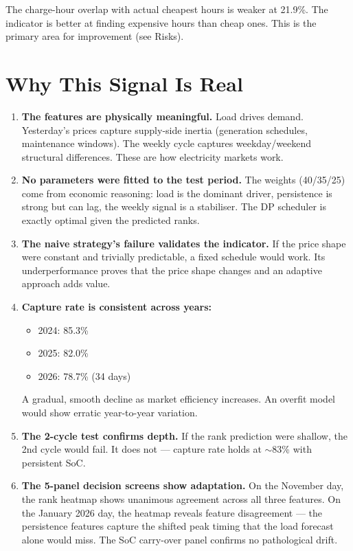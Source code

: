 \documentclass[11pt,a4paper]{article}
\begin{document}
The charge-hour overlap with actual cheapest hours is weaker at 21.9\%. The indicator is better at finding expensive hours than cheap ones. This is the primary area for improvement (see Risks).

\section{Why This Signal Is Real}

\begin{enumerate}[leftmargin=*]
\item \textbf{The features are physically meaningful.} Load drives demand. Yesterday's prices capture supply-side inertia (generation schedules, maintenance windows). The weekly cycle captures weekday/weekend structural differences. These are how electricity markets work.

\item \textbf{No parameters were fitted to the test period.} The weights (40/35/25) come from economic reasoning: load is the dominant driver, persistence is strong but can lag, the weekly signal is a stabiliser. The DP scheduler is exactly optimal given the predicted ranks.

\item \textbf{The naive strategy's failure validates the indicator.} If the price shape were constant and trivially predictable, a fixed schedule would work. Its underperformance proves that the price shape changes and an adaptive approach adds value.

\item \textbf{Capture rate is consistent across years:}
\begin{itemize}
\item 2024: 85.3\%
\item 2025: 82.0\%
\item 2026: 78.7\% (34 days)
\end{itemize}
A gradual, smooth decline as market efficiency increases. An overfit model would show erratic year-to-year variation.

\item \textbf{The 2-cycle test confirms depth.} If the rank prediction were shallow, the 2nd cycle would fail. It does not --- capture rate holds at $\sim$83\% with persistent SoC.

\item \textbf{The 5-panel decision screens show adaptation.} On the November day, the rank heatmap shows unanimous agreement across all three features. On the January 2026 day, the heatmap reveals feature disagreement --- the persistence features capture the shifted peak timing that the load forecast alone would miss. The SoC carry-over panel confirms no pathological drift.
\end{enumerate}
\end{document}
